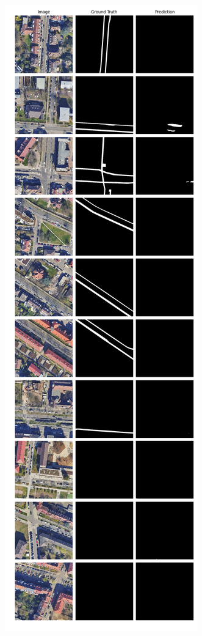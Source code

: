 	\begin{figure}
	\centering
	\begin{subfigure}{.4\textwidth}
		\centering
		\includegraphics[width=1.\textwidth]{Bilder/Samples-KA/bunet2-r.png} 

\end{subfigure}
\end{figure}
